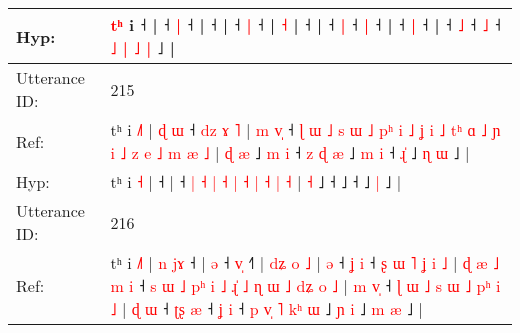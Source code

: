 \documentclass[10pt]{article}
\DeclareRobustCommand{\hl}[1]{{\textcolor{red}{#1}}}
\begin{document}
\begin{longtable}{ll}
 \\
Hyp: & \hl{}\hl{}\hl{}\hl{}\hl{}\hl{}\hl{}\hl{}\hl{t}\hl{ʰ} i\hl{} ˧ |\hl{}\hl{}\hl{}\hl{}\hl{}\hl{}\hl{}\hl{}\hl{}\hl{}\hl{} ˧\hl{}\hl{}\hl{} \hl{|} ˧\hl{} |\hl{}\hl{}\hl{}\hl{} ˧\hl{}\hl{}\hl{}\hl{}\hl{}\hl{}\hl{} |\hl{}\hl{}\hl{}\hl{} ˧\hl{}\hl{} \hl{|} ˧\hl{}\hl{}\hl{}\hl{}\hl{}\hl{} |\hl{}\hl{}\hl{}\hl{}\hl{}\hl{}\hl{}\hl{} \hl{}\hl{˧} |\hl{}\hl{}\hl{}\hl{} ˧ |\hl{}\hl{}\hl{}\hl{}\hl{} ˧\hl{}\hl{}\hl{}\hl{} \hl{|} ˧ \hl{}\hl{|} ˧ |\hl{}\hl{}\hl{}\hl{} ˧\hl{}\hl{} \hl{|} ˧\hl{}\hl{}\hl{}\hl{}\hl{}\hl{}\hl{} |\hl{}\hl{}\hl{}\hl{} ˧\hl{}\hl{}\hl{} \hl{˩} ˧\hl{}\hl{} \hl{˩} ˧\hl{}\hl{} \hl{}\hl{˩} \hl{|} \hl{}\hl{˩} \hl{|} ˩ |
 \\
\midrule
Utterance ID: & 215 \\
Ref: & tʰ i \hl{˩}\hl{˥} |\hl{ }\hl{ɖ}\hl{ }\hl{ɯ} ˧\hl{ }\hl{d}\hl{z}\hl{ }\hl{ɤ}\hl{ }\hl{˥} |\hl{ }\hl{m}\hl{ }\hl{v}\hl{̩} ˧\hl{ }\hl{ɭ}\hl{ }\hl{ɯ}\hl{ }\hl{˩}\hl{ }\hl{s}\hl{ }\hl{ɯ}\hl{ }\hl{˩}\hl{ }\hl{p}\hl{ʰ}\hl{ }\hl{i}\hl{ }\hl{˩}\hl{ }\hl{ʝ}\hl{ }\hl{i}\hl{ }\hl{˩}\hl{ }\hl{t}\hl{ʰ}\hl{ }\hl{ɑ} \hl{˩} \hl{ɲ} \hl{i} \hl{˩} \hl{z} \hl{e} \hl{˩} \hl{m} \hl{æ} \hl{˩} |\hl{ }\hl{ɖ} \hl{æ} ˩\hl{ }\hl{m}\hl{ }\hl{i} ˧\hl{ }\hl{z}\hl{ }\hl{ɖ}\hl{ }\hl{æ} ˩\hl{ }\hl{m}\hl{ }\hl{i} ˧\hl{ }\hl{ɻ}\hl{̍} ˩\hl{ }\hl{ɳ} \hl{ɯ} ˩ |
 \\
Hyp: & tʰ i \hl{}\hl{˧} |\hl{}\hl{}\hl{}\hl{} ˧\hl{}\hl{}\hl{}\hl{}\hl{}\hl{}\hl{} |\hl{}\hl{}\hl{}\hl{}\hl{} ˧\hl{}\hl{}\hl{}\hl{}\hl{}\hl{}\hl{}\hl{}\hl{}\hl{}\hl{}\hl{}\hl{}\hl{}\hl{}\hl{}\hl{}\hl{}\hl{}\hl{}\hl{}\hl{}\hl{}\hl{}\hl{}\hl{}\hl{}\hl{}\hl{}\hl{} \hl{|} \hl{˧} \hl{|} \hl{˧} \hl{|} \hl{˧} \hl{|} \hl{˧} \hl{|} \hl{˧} |\hl{}\hl{} \hl{˧} ˩\hl{}\hl{}\hl{}\hl{} ˧\hl{}\hl{}\hl{}\hl{}\hl{}\hl{} ˩\hl{}\hl{}\hl{}\hl{} ˧\hl{}\hl{}\hl{} ˩\hl{}\hl{} \hl{|} ˩ |
 \\
\midrule
Utterance ID: & 216 \\
Ref: & tʰ i \hl{˩}\hl{˥} |\hl{ }\hl{n}\hl{ }\hl{j}\hl{ɤ} ˧ |\hl{ }\hl{ə} ˧ \hl{v}\hl{̩} ˧\hl{˥} |\hl{ }\hl{d}\hl{ʑ}\hl{ }\hl{o} \hl{˩} |\hl{ }\hl{ə} ˧\hl{ }\hl{ʝ} \hl{i} ˧\hl{ }\hl{ʂ}\hl{ }\hl{ɯ}\hl{ }\hl{˥}\hl{ }\hl{ʝ}\hl{ }\hl{i}\hl{ }\hl{˩} |\hl{ }\hl{ɖ}\hl{ }\hl{æ}\hl{ }\hl{˩}\hl{ }\hl{m}\hl{ }\hl{i} ˧\hl{ }\hl{s}\hl{ }\hl{ɯ}\hl{ }\hl{˩}\hl{ }\hl{p}\hl{ʰ}\hl{ }\hl{i}\hl{ }\hl{˩}\hl{ }\hl{ɻ}\hl{̍}\hl{ }\hl{˩}\hl{ }\hl{ɳ}\hl{ }\hl{ɯ}\hl{ }\hl{˩}\hl{ }\hl{d}\hl{ʑ}\hl{ }\hl{o}\hl{ }\hl{˩} |\hl{ }\hl{m}\hl{ }\hl{v}\hl{̩} ˧\hl{ }\hl{ɭ}\hl{ }\hl{ɯ}\hl{ }\hl{˩}\hl{ }\hl{s}\hl{ }\hl{ɯ}\hl{ }\hl{˩}\hl{ }\hl{p}\hl{ʰ}\hl{ }\hl{i}\hl{ }\hl{˩} |\hl{ }\hl{ɖ}\hl{ }\hl{ɯ} ˧\hl{ }\hl{ʈ}\hl{ʂ} \hl{æ} ˧\hl{ }\hl{ʝ} \hl{i} ˧\hl{ }\hl{p}\hl{ }\hl{v}\hl{̩}\hl{ }\hl{˥}\hl{ }\hl{k}\hl{ʰ}\hl{ }\hl{ɯ} ˩\hl{ }\hl{ɲ} \hl{i} ˩\hl{ }\hl{m} \hl{æ} ˩ |

\end{longtable}
\end{document}
